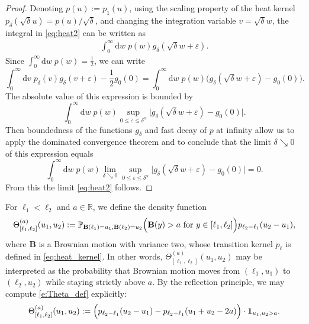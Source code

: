 \documentclass[oneside,final,11pt]{amsart}
\theoremstyle{definition}
\renewcommand{\d}{\mathrm{d}}
\newcommand{\R}{\mathbb{R}}
\newcommand{\1}[1]{\mathbf{1}_{#1}}
\newcommand{\eps}{\varepsilon}
\newcommand{\fB}{\mathbf{B}}
\renewcommand{\P}{\mathbb P}
\numberwithin{equation}{section}
\begin{document}
\begin{proof}
Denoting $p(u) := p_1(u)$, using the scaling property of the heat kernel $p_{\delta}(\sqrt{\delta} u) = p(u) / \sqrt \delta$, and changing the integration variable $v = \sqrt \delta w$, the integral in \eqref{eq:heat2} can be written as
\begin{align}\label{eq:change_of_variables}
	\int_{0}^\infty \d w\; p(w) g_\delta(\sqrt \delta w + \eps).
\end{align}
Since $\int_{0}^\infty \d w\; p(w) = \frac{1}{2}$, we can write
\begin{equation}
	\int_{0}^\infty \d v\; p_{\delta}(v) g_\delta(v + \eps) - \frac{1}{2} g_0(0) = \int_{0}^\infty \d w\; p(w) \bigl(g_\delta(\sqrt \delta w + \eps) - g_0(0)\bigr).
\end{equation}
The absolute value of this expression is bounded by
\begin{equation}
	\int_{0}^\infty \d w\; p(w) \sup_{0 \leq \eps \leq \delta^\alpha} \bigl|g_\delta(\sqrt \delta w + \eps) - g_0(0)\bigr|.
\end{equation}
Then boundedness of the functions $g_\delta$ and fast decay of $p$ at infinity allow us to apply the dominated convergence theorem and to conclude that the limit $\delta \searrow 0$ of this expression equals
\begin{equation}
	\int_{0}^\infty \d w\; p(w) \lim_{\delta \searrow 0} \sup_{0 \leq \eps \leq \delta^\alpha} \bigl|g_\delta(\sqrt \delta w + \eps) - g_0(0)\bigr| = 0.
\end{equation}
From this the limit \eqref{eq:heat2} follows.
\end{proof}

For $\ell_1 < \ell_2$ and $a \in \R$, we define the density function
\begin{equation}\label{e:Theta_def}
\Theta^{(a)}_{[\ell_1, \ell_2]}(u_1, u_2) := \P_{\fB(\ell_1)=u_1, \fB(\ell_2) = u_2}\Bigl(\fB(y) > a \text{ for } y \in [\ell_1,\ell_2]\Bigr) p_{\ell_2 - \ell_1}(u_2 - u_1),
\end{equation}
where $\fB$ is a Brownian motion with variance two, whose transition kernel $p_\ell$ is defined in \eqref{eq:heat_kernel}. In other words, $\Theta^{(a)}_{[\ell_1, \ell_2]}(u_1, u_2)$ may be interpreted as the probability that Brownian motion  moves from $(\ell_1, u_1)$ to $(\ell_2, u_2)$ while staying strictly above $a$. By the reflection principle, we may compute \eqref{e:Theta_def} explicitly:
\begin{equation}\label{e:Theta_formula}
\Theta^{(a)}_{[\ell_1, \ell_2]}(u_1, u_2) := \Bigl(p_{\ell_2 - \ell_1}(u_2 - u_1) - p_{\ell_2 - \ell_1}(u_1 + u_2 - 2a)\Bigr) \cdot \1{u_1, u_2 > a}.
\end{equation}
\end{document}
